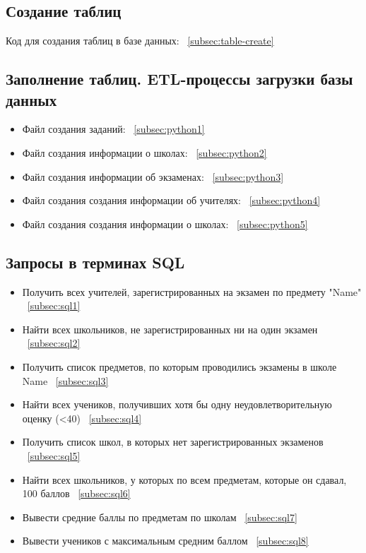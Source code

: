 \documentclass[a4paper]{article}
\begin{document}
\subsection{Создание таблиц}
Код для создания таблиц в базе данных: ~\ref{subsec:table-create}

\subsection{Заполнение таблиц. ETL-процессы загрузки базы данных}
\begin{itemize}
      \item Файл создания заданий: ~\ref{subsec:python1}
      \item Файл создания информации о школах: ~\ref{subsec:python2}
      \item Файл создания информации об экзаменах: ~\ref{subsec:python3}
      \item Файл создания создания информации об учителях: ~\ref{subsec:python4}
      \item Файл создания создания информации о школах: ~\ref{subsec:python5}
\end{itemize}

\subsection{Запросы в терминах SQL}
\begin{itemize}
      \item Получить всех учителей, зарегистрированных на экзамен по предмету "Name"  ~\ref{subsec:sql1}
      \item Найти всех школьников, не зарегистрированных ни на один экзамен  ~\ref{subsec:sql2}
      \item Получить список предметов, по которым проводились экзамены в школе Name ~\ref{subsec:sql3}
      \item Найти всех учеников, получивших хотя бы одну неудовлетворительную оценку (<40) ~\ref{subsec:sql4}
      \item Получить список школ, в которых нет зарегистрированных экзаменов ~\ref{subsec:sql5}
      \item Найти всех школьников, у которых по всем предметам, которые он сдавал, 100 баллов ~\ref{subsec:sql6}
      \item Вывести средние баллы по предметам по школам ~\ref{subsec:sql7}
      \item Вывести учеников с максимальным средним баллом ~\ref{subsec:sql8}
\end{itemize}
\end{document}
